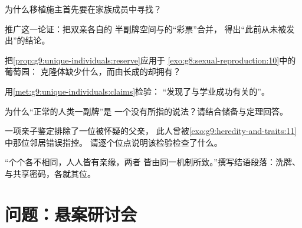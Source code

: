\begin{exercise}[$\star$]\label{exo:g9:unique-individuals:6}
为什么移植施主首先要在家族成员中寻找？
\end{exercise}

\begin{exercise}[$\star\star$]\label{exo:g9:unique-individuals:7}
推广这一论证：把双亲各自的
半副牌空间与的“彩票”合并，
得出“此前从未被发出”的结论。
\end{exercise}

\begin{exercise}[$\star\star$]\label{exo:g9:unique-individuals:8}
把\cref{prop:g9:unique-individuals:reserve}应用于
\cref{exo:g8:sexual-reproduction:10}中的葡萄园：
克隆体缺少什么，而由长成的却拥有？
\end{exercise}

\begin{exercise}[$\star\star$]\label{exo:g9:unique-individuals:9}
用\cref{met:g9:unique-individuals:claims}检验：
“发现了与学业成功有关的”。
\end{exercise}

\begin{exercise}[$\star\star$]\label{exo:g9:unique-individuals:10}
为什么“正常的人类一副牌”是
一个没有所指的说法？请结合储备与定理回答。
\end{exercise}

\begin{exercise}[$\star\star$]\label{exo:g9:unique-individuals:11}
一项亲子鉴定排除了一位被怀疑的父亲，
此人曾被\cref{exo:g9:heredity-and-traits:11}中那位邻居错误指控。
请逐个位点说明该检验检查了什么。
\end{exercise}

\begin{exercise}[$\star\star\star$]\label{exo:g9:unique-individuals:12}
“个个各不相同，人人皆有亲缘，两者
皆由同一机制所致。”撰写结语段落：洗牌、
与共享密码，各就其位。
\end{exercise}

\section{问题：悬案研讨会}

